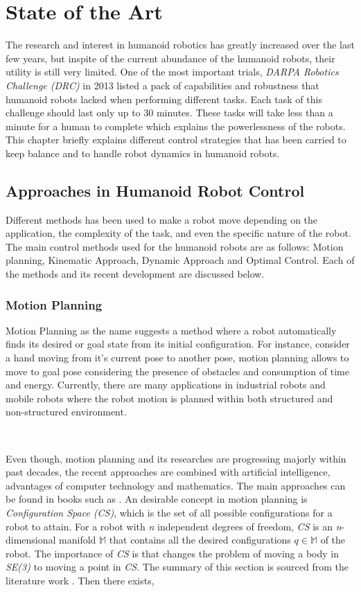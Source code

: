 \chapter{State of the Art}


The research and interest in humanoid robotics has greatly increased over the last few years, but inspite of the current
abundance of the humanoid robots, their utility is still very limited. One of the most important trials, \textit{DARPA 
Robotics Challenge (DRC)} in 2013 listed a pack of capabilities and robustness that humanoid robots lacked when performing 
different tasks. Each task of this challenge should last only up to 30 minutes. These tasks will take less than a minute 
for a human to complete which  explains the powerlessness of the robots. This chapter briefly explains different control 
strategies that has been carried to keep balance and to handle robot dynamics in humanoid robots.

\section{Approaches in Humanoid Robot Control}

Different methods has been used to make a robot move depending on the application, the complexity of the task, and even
the specific nature of the robot. The main control methods used for the humanoid robots are as follows: Motion planning,
Kinematic Approach, Dynamic Approach and Optimal Control. Each of the methods and its recent development are discussed
below.

\subsection{Motion Planning}

Motion Planning as the name suggests a method where a robot automatically finds its desired or goal state from its initial
configuration. For instance, consider a hand moving from it's current pose to another pose, motion planning allows to move to
goal pose considering the presence of obstacles and consumption of time and energy. Currently, there are many applications in 
industrial robots and mobile robots where the robot motion is planned within both structured and non-structured environment. 

~

Even though, motion planning and its researches are progressing majorly within past decades, the recent approaches are combined
with artificial intelligence, advantages of computer technology and mathematics. The main approaches can be found in books such as 
\cite{Latombe,LaValle2006PlanningA}. An desirable concept in motion planning is \textit{Configuration Space (CS)}, which is the set
of all possible configurations for a robot to attain. For a robot with \textit{n} independent degrees of freedom, \textit{CS} is an 
\textit{n}-dimensional manifold $\mathbb{M}$ that contains all the desired configurations $q \in \mathbb{M}$ of the robot. The importance
of \textit{CS} is that changes the problem of moving a body in \textit{SE(3)} to moving a point in \textit{CS}. The summary of this
section is sourced from the literature work \cite{ramosponce}. Then there exists,

